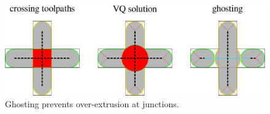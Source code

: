 \begin{figure}
\centering
\includegraphics[width=.99\columnwidth]{sources/method/ghosting.pdf}
\caption{Ghosting prevents over-extrusion at junctions.}
\label{ghosting}
\end{figure}


























































